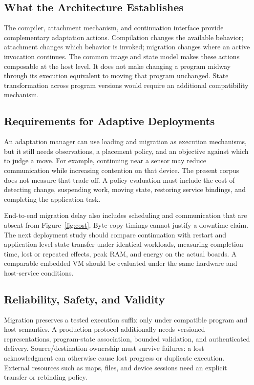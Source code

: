 \documentclass[conference,letterpaper]{IEEEtran}
\begin{document}
\subsection{What the Architecture Establishes}
The compiler, attachment mechanism, and continuation interface provide complementary adaptation actions. Compilation changes the available behavior; attachment changes which behavior is invoked; migration changes where an active invocation continues. The common image and state model makes these actions composable at the host level. It does not make changing a program midway through its execution equivalent to moving that program unchanged. State transformation across program versions would require an additional compatibility mechanism.

\subsection{Requirements for Adaptive Deployments}
An adaptation manager can use loading and migration as execution mechanisms, but it still needs observations, a placement policy, and an objective against which to judge a move. For example, continuing near a sensor may reduce communication while increasing contention on that device. The present corpus does not measure that trade-off. A policy evaluation must include the cost of detecting change, suspending work, moving state, restoring service bindings, and completing the application task.

End-to-end migration delay also includes scheduling and communication that are absent from Figure~\ref{fig:cost}. Byte-copy timings cannot justify a downtime claim. The next deployment study should compare continuation with restart and application-level state transfer under identical workloads, measuring completion time, lost or repeated effects, peak RAM, and energy on the actual boards. A comparable embedded VM should be evaluated under the same hardware and host-service conditions.

\subsection{Reliability, Safety, and Validity}
Migration preserves a tested execution suffix only under compatible program and host semantics. A production protocol additionally needs versioned representations, program-state association, bounded validation, and authenticated delivery. Source/destination ownership must survive failures: a lost acknowledgment can otherwise cause lost progress or duplicate execution. External resources such as maps, files, and device sessions need an explicit transfer or rebinding policy.
\end{document}
